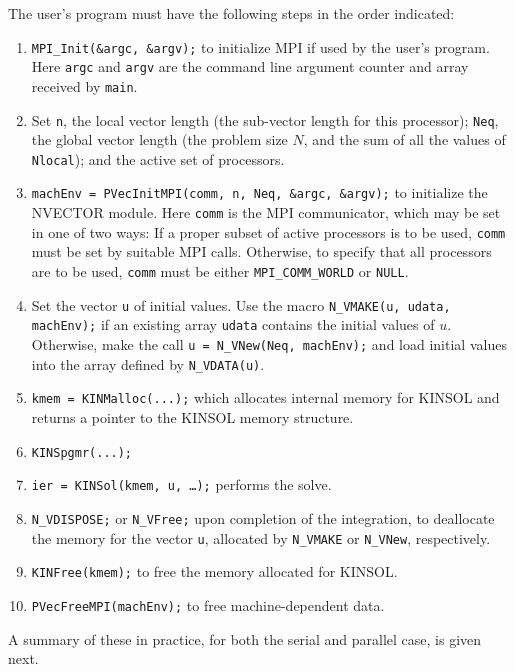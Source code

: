 The user's program must have the following steps in the order indicated:
\vspace{.2 in}
\begin{enumerate}

\item {\tt MPI\_Init(\&argc, \&argv);} to initialize MPI if used by
the user's program.  Here {\tt argc} and {\tt argv} are the command
line argument counter and array received by {\tt main}.

\item Set {\tt n}, the local vector length (the sub-vector
length for this processor); {\tt Neq}, the global vector length (the
problem size $N$, and the sum of all the values of {\tt Nlocal});
and the active set of processors.

\item {\tt machEnv = PVecInitMPI(comm, n, Neq, \&argc, \&argv);} to
initialize the NVECTOR module.  Here {\tt comm} is the MPI
communicator, which may be set in one of two ways: If a proper subset of active
processors is to be used, {\tt comm} must be set by suitable MPI
calls.  Otherwise, to specify that all processors are to be used, 
{\tt comm} must be either {\tt MPI\_COMM\_WORLD} or {\tt NULL}.

\item Set the vector {\tt u} of initial values.  Use the macro
{\tt N\_VMAKE(u, udata, machEnv);} if an existing array {\tt udata} 
contains the initial values of $u$.  Otherwise, make the call
{\tt u = N\_VNew(Neq, machEnv);} and load initial values into
the array defined by {\tt N\_VDATA(u)}.

\item {\tt kmem = KINMalloc(...);} which allocates internal
memory for KINSOL and returns a pointer to the KINSOL memory structure. 

\item {\tt KINSpgmr(...);}

\item {\tt ier = KINSol(kmem,  u, \ldots );} performs the solve.

\item {\tt N\_VDISPOSE;} or {\tt N\_VFree;} upon completion of the
integration, to deallocate the memory for the vector {\tt u}, allocated
by {\tt N\_VMAKE} or {\tt N\_VNew}, respectively.

\item {\tt KINFree(kmem);} to free the memory allocated for KINSOL.

\item {\tt PVecFreeMPI(machEnv);} to free machine-dependent data.

\end{enumerate}
\vspace{.2 in}
 A summary of these in practice, for both the serial and parallel case, is 
given next.
\vspace{.2 in}

